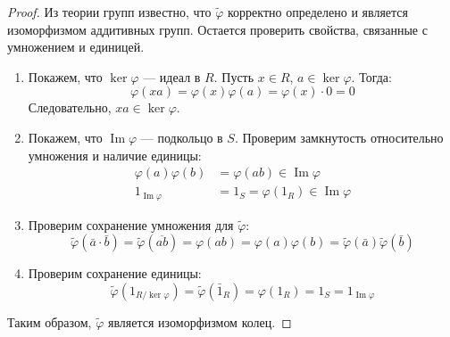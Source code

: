 \begin{proof}
	Из теории групп известно, что $\tilde{\varphi}$ корректно определено и является изоморфизмом аддитивных групп. Остается проверить свойства, связанные с умножением и единицей.

	\begin{enumerate}
		\item Покажем, что $\ker\varphi$ --- идеал в $R$. Пусть $x \in R$, $a \in \ker\varphi$. Тогда:
		\[ \varphi(xa) = \varphi(x)\varphi(a) = \varphi(x) \cdot 0 = 0 \]
		Следовательно, $xa \in \ker\varphi$.

		\item Покажем, что $\operatorname{Im}\varphi$ --- подкольцо в $S$. Проверим замкнутость относительно умножения и наличие единицы:
		\begin{align*}
			\varphi(a)\varphi(b) &= \varphi(ab) \in \operatorname{Im}\varphi \\
			1_{\operatorname{Im}\varphi} &= 1_S = \varphi(1_R) \in \operatorname{Im}\varphi
		\end{align*}

		\item Проверим сохранение умножения для $\tilde{\varphi}$:
		\[ \tilde{\varphi}(\bar{a} \cdot \bar{b}) = \tilde{\varphi}(\overline{ab}) = \varphi(ab) = \varphi(a)\varphi(b) = \tilde{\varphi}(\bar{a})\tilde{\varphi}(\bar{b}) \]

		\item Проверим сохранение единицы:
		\[ \tilde{\varphi}(1_{R/\ker\varphi}) = \tilde{\varphi}(\bar{1}_R) = \varphi(1_R) = 1_S = 1_{\operatorname{Im}\varphi} \]
	\end{enumerate}
	Таким образом, $\tilde{\varphi}$ является изоморфизмом колец.
\end{proof}
